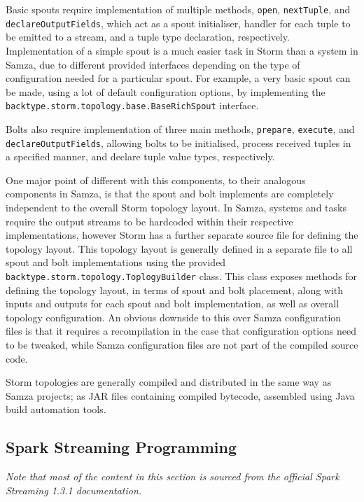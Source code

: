 Basic spouts require implementation of multiple methods, \texttt{open}, \texttt{nextTuple}, and \texttt{declareOutputFields},
which act as a spout initialiser, handler for each tuple to be emitted to a stream, and a tuple type declaration, respectively.
Implementation of a simple spout is a much easier task in Storm than a system in Samza, due to different provided interfaces
depending on the type of configuration needed for a particular spout. For example, a very basic spout can be made, using
a lot of default configuration options, by implementing the \texttt{backtype.storm.topology.base.BaseRichSpout} interface.

Bolts also require implementation of three main methods, \texttt{prepare}, \texttt{execute}, and \texttt{declareOutputFields},
allowing bolts to be initialised, process received tuples in a specified manner, and declare tuple value types, respectively.

One major point of different with this components, to their analogous components in Samza, is that the spout and bolt
implements are completely independent to the overall Storm topology layout. In Samza, systems and tasks require the output
streams to be hardcoded within their respective implementations, however Storm has a further separate source file for
defining the topology layout. This topology layout is generally defined in a separate file to all spout and bolt implementations
using the provided \texttt{backtype.storm.topology.ToplogyBuilder} class. This class exposes methods for defining the
topology layout, in terms of spout and bolt placement, along with inputs and outputs for each spout and bolt implementation,
as well as overall topology configuration. An obvious downside to this over Samza configuration files is that it requires
a recompilation in the case that configuration options need to be tweaked, while Samza configuration files are not part
of the compiled source code.

Storm topologies are generally compiled and distributed in the same way as Samza projects; as JAR files containing compiled
bytecode, assembled using Java build automation tools.



\subsection{Spark Streaming Programming} %
\label{sub:spark_streaming_programming}

\textit{Note that most of the content in this section is sourced from the official Spark Streaming 1.3.1 documentation.}~\cite{Spark:doc}

